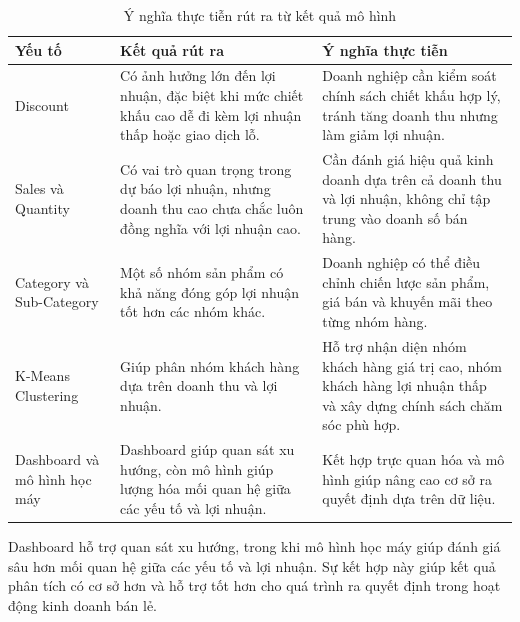 \begin{table}[H]
	\centering
	\caption{Ý nghĩa thực tiễn rút ra từ kết quả mô hình}
	\label{tab:practical_meaning_model}
	\renewcommand{\arraystretch}{1.3}
	\begin{tabular}{|p{3.2cm}|p{5.3cm}|p{5.3cm}|}
		\hline
		\textbf{Yếu tố} & \textbf{Kết quả rút ra} & \textbf{Ý nghĩa thực tiễn} \\ \hline
		
		Discount & Có ảnh hưởng lớn đến lợi nhuận, đặc biệt khi mức chiết khấu cao dễ đi kèm lợi nhuận thấp hoặc giao dịch lỗ. 
		& Doanh nghiệp cần kiểm soát chính sách chiết khấu hợp lý, tránh tăng doanh thu nhưng làm giảm lợi nhuận. \\ \hline
		
		Sales và Quantity & Có vai trò quan trọng trong dự báo lợi nhuận, nhưng doanh thu cao chưa chắc luôn đồng nghĩa với lợi nhuận cao. 
		& Cần đánh giá hiệu quả kinh doanh dựa trên cả doanh thu và lợi nhuận, không chỉ tập trung vào doanh số bán hàng. \\ \hline
		
		Category và Sub-Category & Một số nhóm sản phẩm có khả năng đóng góp lợi nhuận tốt hơn các nhóm khác. 
		& Doanh nghiệp có thể điều chỉnh chiến lược sản phẩm, giá bán và khuyến mãi theo từng nhóm hàng. \\ \hline
		
		K-Means Clustering & Giúp phân nhóm khách hàng dựa trên doanh thu và lợi nhuận. 
		& Hỗ trợ nhận diện nhóm khách hàng giá trị cao, nhóm khách hàng lợi nhuận thấp và xây dựng chính sách chăm sóc phù hợp. \\ \hline
		
		Dashboard và mô hình học máy & Dashboard giúp quan sát xu hướng, còn mô hình giúp lượng hóa mối quan hệ giữa các yếu tố và lợi nhuận. 
		& Kết hợp trực quan hóa và mô hình giúp nâng cao cơ sở ra quyết định dựa trên dữ liệu. \\ \hline
	\end{tabular}
\end{table}

Dashboard hỗ trợ quan sát xu hướng, trong khi mô hình học máy giúp đánh giá sâu hơn mối quan hệ giữa các yếu tố và lợi nhuận. Sự kết hợp này giúp kết quả phân tích có cơ sở hơn và hỗ trợ tốt hơn cho quá trình ra quyết định trong hoạt động kinh doanh bán lẻ.